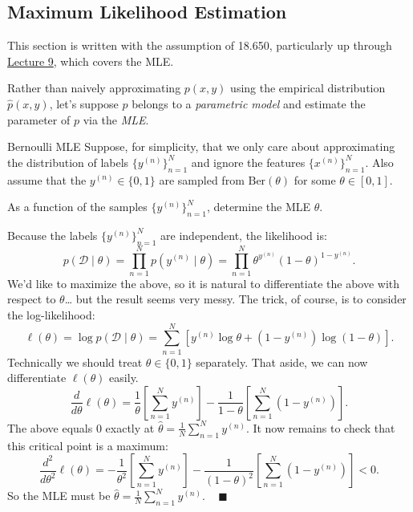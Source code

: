 \subsection{Maximum Likelihood Estimation}

\begin{remark}
    This section is written with the assumption of 18.650,
    particularly up through \href{/18.650/lectures/9}{Lecture 9},
    which covers the MLE.
\end{remark}

Rather than naively approximating $p(x, y)$ using the empirical distribution $\widehat{p}(x, y)$,
let's suppose $p$ belongs to a \emph{parametric model}
and estimate the parameter of $p$ via the \emph{MLE}.

\begin{problem}{Bernoulli MLE}
    Suppose, for simplicity, that we only care about
    approximating the distribution of labels $\{y^{(n)}\}_{n = 1}^N$
    and ignore the features $\{x^{(n)}\}_{n = 1}^N$.
    Also assume that the $y^{(n)} \in \{0, 1\}$
    are sampled from $\mathrm{Ber}(\theta)$ for some $\theta \in [0, 1]$.

    As a function of the samples $\{y^{(n)}\}_{n = 1}^N$,
    determine the MLE $\hat{\theta}$.
\end{problem}

\begin{solution}
    Because the labels $\{y^{(n)}\}_{n = 1}^N$ are independent, the likelihood is:
    \[ p(\mathcal{D} \mid \theta)
    = \prod_{n = 1}^N p(y^{(n)} \mid \theta)
    = \prod_{n = 1}^N \theta^{y^{(n)}} (1 - \theta)^{1 - y^{(n)}}. \]
    We'd like to maximize the above,
    so it is natural to differentiate the above with respect to $\theta$\dots
    but the result seems very messy.
    The trick, of course, is to consider the log-likelihood:
    \[ \ell(\theta) = \log p(\mathcal{D} \mid \theta)
    = \sum_{n = 1}^N \left[
        y^{(n)} \log \theta + (1 - y^{(n)}) \log (1 - \theta)
    \right]. \]
    Technically we should treat $\theta \in \{0, 1\}$ separately.
    That aside, we can now differentiate $\ell(\theta)$ easily.
    \[ \frac{d}{d\theta} \ell(\theta)
    = \frac{1}{\theta}\left[\sum_{n = 1}^N y^{(n)}\right]
    - \frac{1}{1 - \theta}\left[\sum_{n = 1}^N (1 - y^{(n)})\right]. \]
    The above equals $0$ exactly at $\hat{\theta} = \frac{1}{N}\sum_{n = 1}^N y^{(n)}$.
    It now remains to check that this critical point is a maximum:
    \[ \frac{d^2}{d\theta^2} \ell(\theta)
    = -\frac{1}{\theta^2}\left[\sum_{n = 1}^N y^{(n)}\right]
    - \frac{1}{(1 - \theta)^2}\left[\sum_{n = 1}^N (1 - y^{(n)})\right] < 0. \]
    So the MLE must be $\hat{\theta} = \frac{1}{N}\sum_{n = 1}^N y^{(n)}$. ~ $\blacksquare$
\end{solution}

